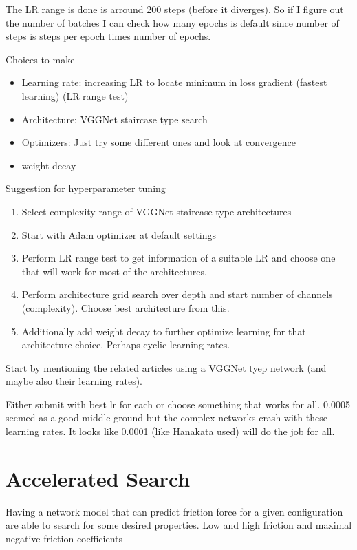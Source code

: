 The LR range is done is arround 200 steps (before it diverges). So if I figure out the number of batches I can check how many epochs is default since number of steps is steps per epoch times number of epochs. 



\clearpage

Choices to make
\begin{itemize}
  \item Learning rate: increasing LR to locate minimum in loss gradient (fastest learning) (LR range test) %
  \item Architecture: VGGNet staircase type search
  \item Optimizers: Just try some different ones and look at convergence
  \item weight decay
\end{itemize}

Suggestion for hyperparameter tuning 
\begin{enumerate}
  \item Select complexity range of VGGNet staircase type architectures
  \item Start with Adam optimizer at default settings
  \item Perform LR range test to get information of a suitable LR and choose one that will work for most of the architectures. 
  \item Perform architecture grid search over depth and start number of channels (complexity). Choose best architecture from this. 
  \item Additionally add weight decay to further optimize learning for that architecture choice. Perhaps cyclic learning rates. 
\end{enumerate}

Start by mentioning the related articles using a VGGNet tyep network (and maybe also their learning rates). 

 
Either submit with best lr for each or choose something that works for all. 0.0005 seemed as a good middle ground but the complex networks crash with these learning rates. It looks like 0.0001 (like Hanakata used) will do the job for all. 

\section{Accelerated Search}

Having a network model that can predict friction force for a given configuration are able to search for some desired properties. Low and high friction and maximal negative friction coefficients


